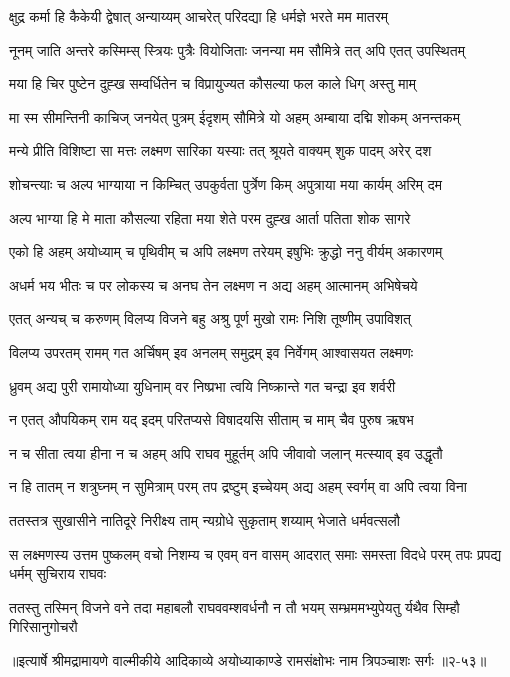 \twolineshloka
{क्षुद्र कर्मा हि कैकेयी द्वेषात् अन्याय्यम् आचरेत्}
{परिदद्या हि धर्मज्ञे भरते मम मातरम्} %

\twolineshloka
{नूनम् जाति अन्तरे कस्मिम्स् स्त्रियः पुत्रैः वियोजिताः}
{जनन्या मम सौमित्रे तत् अपि एतत् उपस्थितम्} %

\twolineshloka
{मया हि चिर पुष्टेन दुह्ख सम्वर्धितेन च}
{विप्रायुज्यत कौसल्या फल काले धिग् अस्तु माम्} %

\twolineshloka
{मा स्म सीमन्तिनी काचिज् जनयेत् पुत्रम् ईदृशम्}
{सौमित्रे यो अहम् अम्बाया दद्मि शोकम् अनन्तकम्} %

\twolineshloka
{मन्ये प्रीति विशिष्टा सा मत्तः लक्ष्मण सारिका}
{यस्याः तत् श्रूयते वाक्यम् शुक पादम् अरेर् दश} %

\twolineshloka
{शोचन्त्याः च अल्प भाग्याया न किम्चित् उपकुर्वता}
{पुर्त्रेण किम् अपुत्राया मया कार्यम् अरिम् दम} %

\twolineshloka
{अल्प भाग्या हि मे माता कौसल्या रहिता मया}
{शेते परम दुह्ख आर्ता पतिता शोक सागरे} %

\twolineshloka
{एको हि अहम् अयोध्याम् च पृथिवीम् च अपि लक्ष्मण}
{तरेयम् इषुभिः क्रुद्धो ननु वीर्यम् अकारणम्} %

\twolineshloka
{अधर्म भय भीतः च पर लोकस्य च अनघ}
{तेन लक्ष्मण न अद्य अहम् आत्मानम् अभिषेचये} %

\twolineshloka
{एतत् अन्यच् च करुणम् विलप्य विजने बहु}
{अश्रु पूर्ण मुखो रामः निशि तूष्णीम् उपाविशत्} %

\twolineshloka
{विलप्य उपरतम् रामम् गत अर्चिषम् इव अनलम्}
{समुद्रम् इव निर्वेगम् आश्वासयत लक्ष्मणः} %

\twolineshloka
{ध्रुवम् अद्य पुरी रामायोध्या युधिनाम् वर}
{निष्प्रभा त्वयि निष्क्रान्ते गत चन्द्रा इव शर्वरी} %

\twolineshloka
{न एतत् औपयिकम् राम यद् इदम् परितप्यसे}
{विषादयसि सीताम् च माम् चैव पुरुष ऋषभ} %

\twolineshloka
{न च सीता त्वया हीना न च अहम् अपि राघव}
{मुहूर्तम् अपि जीवावो जलान् मत्स्याव् इव उद्धृतौ} %

\twolineshloka
{न हि तातम् न शत्रुघ्नम् न सुमित्राम् परम् तप}
{द्रष्टुम् इच्चेयम् अद्य अहम् स्वर्गम् वा अपि त्वया विना} %

\twolineshloka
{ततस्तत्र सुखासीने नातिदूरे निरीक्ष्य ताम्}
{न्यग्रोधे सुकृताम् शय्याम् भेजाते धर्मवत्सलौ} %

\fourlineindentedshloka
{स लक्ष्मणस्य उत्तम पुष्कलम् वचो}
{निशम्य च एवम् वन वासम् आदरात्}
{समाः समस्ता विदधे परम् तपः}
{प्रपद्य धर्मम् सुचिराय राघवः} %

\fourlineindentedshloka
{ततस्तु तस्मिन् विजने वने तदा}
{महाबलौ राघववम्शवर्धनौ}
{न तौ भयम् सम्भ्रममभ्युपेयतु}
{र्यथैव सिम्हौ गिरिसानुगोचरौ} %


॥इत्यार्षे श्रीमद्रामायणे वाल्मीकीये आदिकाव्ये अयोध्याकाण्डे रामसंक्षोभः नाम त्रिपञ्चाशः सर्गः ॥२-५३॥
